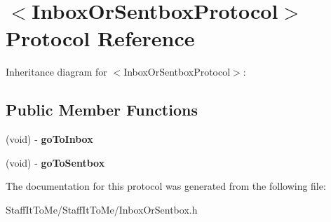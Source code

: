 \hypertarget{protocol_inbox_or_sentbox_protocol-p}{
\section{$<$\-Inbox\-Or\-Sentbox\-Protocol$>$ \-Protocol \-Reference}
\label{protocol_inbox_or_sentbox_protocol-p}
}


\-Inheritance diagram for $<$\-Inbox\-Or\-Sentbox\-Protocol$>$\-:
\subsection*{\-Public \-Member \-Functions}
\begin{DoxyCompactItemize}
\item 
\hypertarget{protocol_inbox_or_sentbox_protocol-p_a2e81646548dd7fbccda2212701200278}{
(void) -\/ {\bfseries go\-To\-Inbox}}
\label{protocol_inbox_or_sentbox_protocol-p_a2e81646548dd7fbccda2212701200278}

\item 
\hypertarget{protocol_inbox_or_sentbox_protocol-p_a9277b86fb2ceeb673ad6623ffb656626}{
(void) -\/ {\bfseries go\-To\-Sentbox}}
\label{protocol_inbox_or_sentbox_protocol-p_a9277b86fb2ceeb673ad6623ffb656626}

\end{DoxyCompactItemize}


\-The documentation for this protocol was generated from the following file\-:\begin{DoxyCompactItemize}
\item 
\-Staff\-It\-To\-Me/\-Staff\-It\-To\-Me/\-Inbox\-Or\-Sentbox.\-h\end{DoxyCompactItemize}
